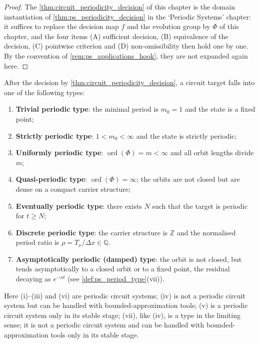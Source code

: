 \begin{proof}
The \cref{thm:circuit_periodicity_decision} of this chapter is the domain instantiation of \cref{thm:ps_periodicity_decision} in the `Periodic Systems' chapter:
it suffices to replace the decision map $f$ and the evolution group by $\Phi$ of this chapter, and the four items (A) sufficient decision, (B) equivalence of the decision, (C) pointwise criterion and
(D) non-omissibility then hold one by one. By the convention of \cref{rem:ps_applications_hook}, they are not expanded again here.
\end{proof}

\begin{corollary}\label{cor:circuit_period_type}
After the decision by \cref{thm:circuit_periodicity_decision}, a circuit target falls into one of the following types:
\begin{enumerate}[label=(\roman*)]
    \item \textbf{Trivial periodic type}: the minimal period is $m_0=1$ and the state is a fixed point;
    \item \textbf{Strictly periodic type}: $1<m_0<\infty$ and the state is strictly periodic;
    \item \textbf{Uniformly periodic type}: $\operatorname{ord}(\Phi)=m<\infty$ and all orbit lengths divide $m$;
    \item \textbf{Quasi-periodic type}: $\operatorname{ord}(\Phi)=\infty$; the orbits are not closed but are dense on a compact carrier structure;
    \item \textbf{Eventually periodic type}: there exists $N$ such that the target is periodic for $t\ge N$;
    \item \textbf{Discrete periodic type}: the carrier structure is $\mathbb Z$ and the normalised period ratio is $\rho=T_x/\Delta x\in\mathbb Q$.
    \item \textbf{Asymptotically periodic (damped) type}: the orbit is not closed, but tends asymptotically to a closed orbit or to a fixed point, the residual decaying as $e^{-\kappa t}$ (see \cref{def:ps_period_type}(vii)).
\end{enumerate}
Here (i)--(iii) and (vi) are periodic circuit systems; (iv) is not a periodic circuit system but can be handled with bounded-approximation tools; (v) is a periodic circuit system only in its stable stage; (vii), like (iv), is a type in the limiting sense; it is not a periodic circuit system and can be handled with bounded-approximation tools only in its stable stage.
\end{corollary}

